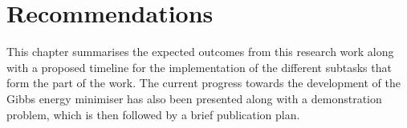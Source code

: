 \chapter{Recommendations} \label{chap:future}


	This chapter summarises the expected outcomes from this research work along with a proposed timeline for the implementation of the different subtasks that form the part of the work. The current progress towards the development of the Gibbs energy minimiser has also been presented along with a demonstration problem, which is then followed by a brief publication plan.
